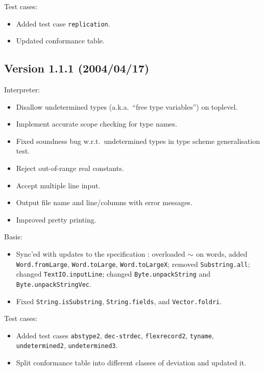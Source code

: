 \documentclass[twoside,titlepage]{article}
\begin{document}
\begin{appendix}
Test cases:
\begin{itemize}[nolistsep]
\item Added test case {\tt replication}.
\item Updated conformance table.
\end{itemize}

\subsection*{Version 1.1.1 (2004/04/17)}

Interpreter:
\begin{itemize}[nolistsep]
\item Disallow undetermined types (a.k.a.\ ``free type variables'') on toplevel.
\item Implement accurate scope checking for type names.
\item Fixed soundness bug w.r.t.\ undetermined types in type scheme generalisation test.
\item Reject out-of-range real constants.
\item Accept multiple line input.
\item Output file name and line/columns with error messages.
\item Improved pretty printing.
\end{itemize}

Basis:
\begin{itemize}[nolistsep]
\item Sync'ed with updates to the specification \cite{basis}: overloaded $\tt\sim$ on words, added {\tt Word.fromLarge}, {\tt Word.toLarge}, {\tt Word.toLargeX}; removed {\tt Substring.all}; changed {\tt TextIO.inputLine}; changed {\tt Byte.unpackString} and {\tt Byte.unpackStringVec}.
\item Fixed {\tt String.isSubstring}, {\tt String.fields}, and {\tt Vector.foldri}.
\end{itemize}

Test cases:
\begin{itemize}[nolistsep]
\item Added test cases {\tt abstype2}, {\tt dec-strdec}, {\tt flexrecord2}, {\tt tyname}, {\tt undetermined2}, {\tt undetermined3}.
\item Split conformance table into different classes of deviation and updated it.
\end{itemize}


\end{appendix}
\end{document}
